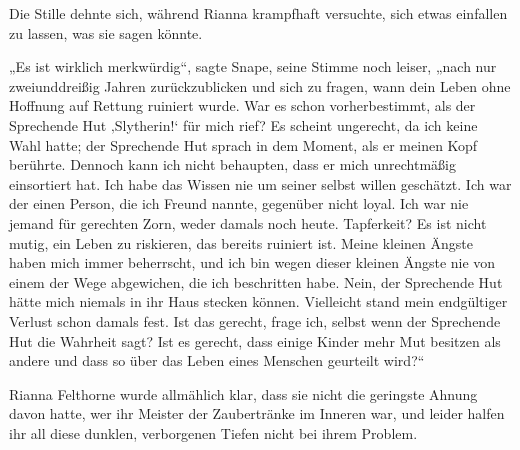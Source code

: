 Die Stille dehnte sich, während Rianna krampfhaft versuchte, sich etwas einfallen zu lassen, was sie sagen könnte.

„Es ist wirklich merkwürdig“, sagte Snape, seine Stimme noch leiser, „nach nur zweiunddreißig Jahren zurückzublicken und sich zu fragen, wann dein Leben ohne Hoffnung auf Rettung ruiniert wurde. War es schon vorherbestimmt, als der Sprechende Hut ‚Slytherin!‘ für mich rief? Es scheint ungerecht, da ich keine Wahl hatte; der Sprechende Hut sprach in dem Moment, als er meinen Kopf berührte. Dennoch kann ich nicht behaupten, dass er mich unrechtmäßig einsortiert hat. Ich habe das Wissen nie um seiner selbst willen geschätzt. Ich war der einen Person, die ich Freund nannte, gegenüber nicht loyal. Ich war nie jemand für gerechten Zorn, weder damals noch heute. Tapferkeit? Es ist nicht mutig, ein Leben zu riskieren, das bereits ruiniert ist. Meine kleinen Ängste haben mich immer beherrscht, und ich bin wegen dieser kleinen Ängste nie von einem der Wege abgewichen, die ich beschritten habe. Nein, der Sprechende Hut hätte mich niemals in ihr Haus stecken können. Vielleicht stand mein endgültiger Verlust schon damals fest. Ist das gerecht, frage ich, selbst wenn der Sprechende Hut die Wahrheit sagt? Ist es gerecht, dass einige Kinder mehr Mut besitzen als andere und dass so über das Leben eines Menschen geurteilt wird?“

Rianna Felthorne wurde allmählich klar, dass sie nicht die geringste Ahnung davon hatte, wer ihr Meister der Zaubertränke im Inneren war, und leider halfen ihr all diese dunklen, verborgenen Tiefen nicht bei ihrem Problem.


